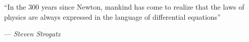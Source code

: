 \documentclass[12pt]{article}
\begin{document}

		\epigraph{``In the 300 years since Newton, mankind has come to realize that the laws of physics are always expressed in the language of differential equations''}{--- \textit{Steven Strogatz}}








%

%

\newpage

\appendix






\nocite{*}
\printbibliography
\end{document}
